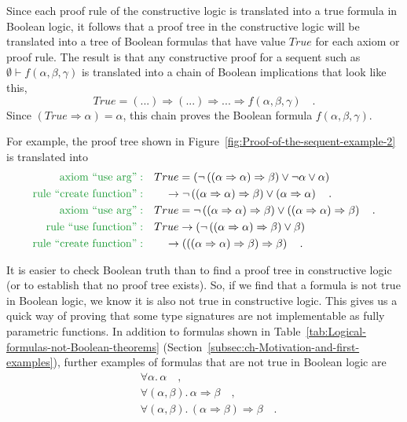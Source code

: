 Since each proof rule of the constructive logic is translated into
a true formula in Boolean logic, it follows that a proof tree in the
constructive logic will be translated into a tree of Boolean formulas
that have value $True$ for each axiom or proof rule. The result is
that any constructive proof for a sequent such as $\emptyset\vdash f(\alpha,\beta,\gamma)$
is translated into a chain of Boolean implications that look like
this,
\[
True=(...)\Rightarrow(...)\Rightarrow...\Rightarrow f(\alpha,\beta,\gamma)\quad.
\]
Since $\left(True\Rightarrow\alpha\right)=\alpha$, this chain proves
the Boolean formula $f(\alpha,\beta,\gamma)$.

For example, the proof tree shown in Figure~\ref{fig:Proof-of-the-sequent-example-2}
is translated into
\begin{align*}
{\color{greenunder}\text{axiom ``use arg''}:}\quad & True=\left(\neg\left(\left(\alpha\Rightarrow\alpha\right)\Rightarrow\beta\right)\vee\neg\alpha\vee\alpha\right)\\
{\color{greenunder}\text{rule ``create function''}:}\quad & \quad\rightarrow\neg\left(\left(\alpha\Rightarrow\alpha\right)\Rightarrow\beta\right)\vee\left(\alpha\Rightarrow\alpha\right)\quad.\\
{\color{greenunder}\text{axiom ``use arg''}:}\quad & True=\neg\left(\left(\alpha\Rightarrow\alpha\right)\Rightarrow\beta\right)\vee\left(\left(\alpha\Rightarrow\alpha\right)\Rightarrow\beta\right)\quad.\\
{\color{greenunder}\text{rule ``use function''}:}\quad & True\rightarrow\left(\neg\left(\left(\alpha\Rightarrow\alpha\right)\Rightarrow\beta\right)\vee\beta\right)\\
{\color{greenunder}\text{rule ``create function''}:}\quad & \quad\rightarrow\left(\left(\left(\alpha\Rightarrow\alpha\right)\Rightarrow\beta\right)\Rightarrow\beta\right)\quad.
\end{align*}

It is easier to check Boolean truth than to find a proof tree in constructive
logic (or to establish that no proof tree exists). So, if we find
that a formula is not true in Boolean logic, we know it is also not
true in constructive logic. This gives us a quick way of proving that
some type signatures are not implementable as fully parametric functions.
In addition to formulas shown in Table~\ref{tab:Logical-formulas-not-Boolean-theorems}
(Section~\ref{subsec:ch-Motivation-and-first-examples}), further
examples of formulas that are not true in Boolean logic are
\begin{align*}
 & \forall\alpha.\,\alpha\quad,\\
 & \forall(\alpha,\beta).\,\alpha\Rightarrow\beta\quad,\\
 & \forall(\alpha,\beta).\,(\alpha\Rightarrow\beta)\Rightarrow\beta\quad.
\end{align*}


